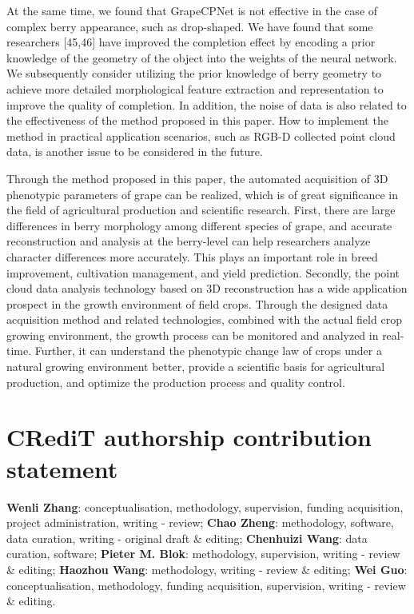 \documentclass[12pt]{article}
\begin{document}
At the same time, we found that GrapeCPNet is not effective in the case of complex berry appearance, such as drop-shaped. 
We have found that some researchers [45,46] have improved the completion effect by encoding a prior knowledge of the geometry of the object into the weights of the neural network. 
We subsequently consider utilizing the prior knowledge of berry geometry to achieve more detailed morphological feature extraction and representation to improve the quality of completion. 
In addition, the noise of data is also related to the effectiveness of the method proposed in this paper. 
How to implement the method in practical application scenarios, such as RGB-D collected point cloud data, is another issue to be considered in the future. 

Through the method proposed in this paper, the automated acquisition of 3D phenotypic parameters of grape can be realized, which is of great significance in the field of agricultural production and scientific research. 
First, there are large differences in berry morphology among different species of grape, and accurate reconstruction and analysis at the berry-level can help researchers analyze character differences more accurately. 
This plays an important role in breed improvement, cultivation management, and yield prediction. 
Secondly, the point cloud data analysis technology based on 3D reconstruction has a wide application prospect in the growth environment of field crops. 
Through the designed data acquisition method and related technologies, combined with the actual field crop growing environment, the growth process can be monitored and analyzed in real-time. 
Further, it can understand the phenotypic change law of crops under a natural growing environment better, provide a scientific basis for agricultural production, and optimize the production process and quality control.


\section*{CRediT authorship contribution statement}
\textbf{Wenli Zhang}: conceptualisation, methodology, supervision, funding acquisition, project administration, writing - review; \textbf{Chao Zheng}: methodology, software, data curation, writing - original draft \& editing; \textbf{Chenhuizi Wang}: data curation, software; \textbf{Pieter M. Blok}: methodology, supervision, writing - review \& editing; \textbf{Haozhou Wang}: methodology, writing - review \& editing; \textbf{Wei Guo}: conceptualisation, methodology, funding acquisition, supervision, writing - review \& editing.
\end{document}

